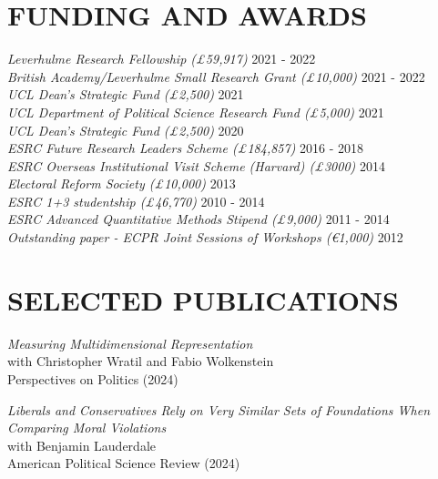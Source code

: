 \documentclass[centered]{res}
\begin{document}
\begin{resume}
\section{FUNDING AND AWARDS} 

\vspace{.5cm}

 {
 {\sl Leverhulme Research Fellowship (\pounds 59,917)} \hfill 2021 - 2022 \\
{\sl British Academy/Leverhulme Small Research Grant  (\pounds 10,000)} \hfill 2021 - 2022 \\
{\sl UCL Dean's Strategic Fund (\pounds 2,500)} \hfill 2021 \\
{\sl UCL Department of Political Science Research Fund (\pounds 5,000)} \hfill 2021 \\
{\sl UCL Dean's Strategic Fund (\pounds 2,500)} \hfill 2020 \\
{\sl ESRC Future Research Leaders Scheme (\pounds 184,857)} \hfill 2016 - 2018 \\
{\sl ESRC Overseas Institutional Visit Scheme (Harvard) (\pounds 3000)} \hfill 2014 \\
{\sl Electoral Reform Society (\pounds 10,000)} \hfill 2013 \\
{\sl ESRC 1+3 studentship (\pounds 46,770)} \hfill 2010 - 2014 \\
{\sl ESRC Advanced Quantitative Methods Stipend (\pounds 9,000)} \hfill 2011 - 2014 \\
{\sl Outstanding paper - ECPR Joint Sessions of Workshops (\euro 1,000)} \hfill 2012 
}


\section{SELECTED PUBLICATIONS} 

\vspace{.5cm}

{\sl Measuring Multidimensional Representation} \\
with Christopher Wratil and Fabio Wolkenstein \\
Perspectives on Politics (2024)

{\sl Liberals and Conservatives Rely on Very Similar Sets of Foundations When Comparing Moral Violations} \\
with Benjamin Lauderdale \\
American Political Science Review (2024)


\end{resume}
\end{document}
